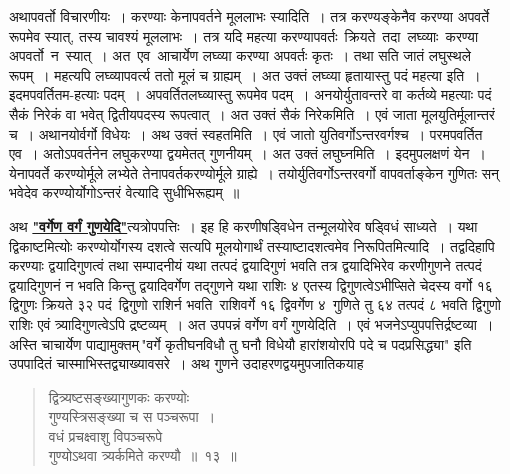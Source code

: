 \documentclass[11pt, openany]{book}
\begin{document}
\vspace{-3mm}
 अथापवर्तो विचारणीयः~। करण्याः केनापवर्तने मूललाभः स्यादिति~।
तत्र करण्यङ्केनैव करण्या अपवर्ते रूपमेव स्यात्, तस्य चावश्यं मूललाभः~।
तत्र यदि महत्या करण्यापवर्तः \,क्रियते \,तदा \,लघ्व्याः \,करण्या \,अपवर्तो \,न \,स्यात्~। अत \,एव \,आचार्येण लघ्व्या करण्या अपवर्तः कृतः~। तथा सति जातं लघुस्थले रूपम्~। महत्यपि लघ्व्यापवर्त्य ततो मूलं च ग्राह्यम्~। अत उक्तं लघ्व्या हृतायास्तु पदं महत्या इति~। इदमपवर्तितम-हत्याः पदम्~। अपवर्तितलघ्व्यास्तु रूपमेव पदम्~। अनयोर्युतावन्तरे वा कर्तव्ये महत्याः पदं सैकं निरेकं वा भवेत् द्वितीयपदस्य रूपत्वात्~। अत उक्तं सैकं निरेकमिति~। एवं जाता मूलयुतिर्मूलान्तरं च~। अथानयोर्वर्गो विधेयः~। अथ उक्तं स्वहतमिति~। एवं जातो 
युतिवर्गोऽन्तरवर्गश्च~। परमपवर्तित एव~। अतोऽपवर्तनेन लघुकरण्या द्वयमेतत्
गुणनीयम्~। अत उक्तं लघुघ्नमिति~। इदमुपलक्षणं येन~। येनापवर्ते करण्योर्मूले
लभ्येते तेनापवर्तकरण्योर्मूले ग्राह्ये~। तयोर्युतिवर्गोऽन्तरवर्गो
वापवर्ताङ्केन गुणितः सन् भवेदेव करण्योर्योगोऽन्तरं वेत्यादि सुधीभिरूह्यम्~॥
\newpage

 अथ \hyperref[12]{\textbf{"वर्गेण वर्गं गुणयेदि"}}त्यत्रोपपत्तिः~। इह हि करणीषड्विधेन तन्मूलयोरेव षड्विधं साध्यते~। यथा द्विकाष्टमित्योः करण्योर्योगस्य दशत्वे सत्यपि मूलयोगार्थं तस्याष्टादशत्वमेव निरूपितमित्यादि~। तद्वदिहापि करण्याः द्वयादिगुणत्वं तथा सम्पादनीयं यथा तत्पदं द्वयादिगुणं भवति तत्र द्वयादिभिरेव करणीगुणने तत्पदं द्वयादिगुणनं न भवति किन्तु द्वयादिवर्गेण तद्गुणने यथा राशिः ४ एतस्य द्विगुणत्वेऽभीप्सिते चेदस्य वर्गो १६ द्विगुणः क्रियते ३२ पदं \,द्विगुणो राशिर्न भवति \,राशिवर्गे १६ द्विवर्गेण ४ \,गुणिते तु ६४ तत्पदं ८
भवति द्विगुणो राशिः एवं त्र्यादिगुणत्वेऽपि द्रष्टव्यम्~। अत उपपन्नं वर्गेण
वर्गं गुणयेदिति~। एवं भजनेऽप्युपपत्तिर्द्रष्टव्या~। अस्ति चाचार्येण
पाद्यामुक्तम्\textendash \,{\qt "वर्गे कृतीघनविधौ तु घनौ विधेयौ हारांशयोरपि पदे च पदप्रसिद्ध्या"} इति उपपादितं चास्माभिस्तद्व्याख्यावसरे~। अथ गुणने उदाहरणद्वयमुपजातिकयाह\textendash 
\begin{quote}
    \ex
      द्वित्र्यष्टसङ्ख्यागुणकः करण्योः\\

\vspace{-7mm}
\hspace{1cm} गुण्यस्त्रिसङ्ख्या च स पञ्चरूपा~। \\

 \vspace{-7mm}
 वधं प्रचक्ष्वाशु विपञ्चरूपे \\

\vspace{-7mm}
\hspace{1cm} गुण्योऽथवा त्र्यर्कमिते करण्यौ~॥~१३~॥

\end{quote}
\end{document}
